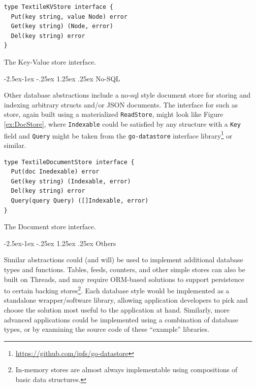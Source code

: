 \documentclass{textile}
\makeatletter
\renewcommand\paragraph{\@startsection{paragraph}{4}{\z@}%
            {-2.5ex\@plus -1ex \@minus -.25ex}%
            {1.25ex \@plus .25ex}%
            {\normalfont\normalsize\itshape}}
\makeatother
\begin{document}
\begin{example}
\begin{minipage}{.45\textwidth}
\begin{lstlisting}
type TextileKVStore interface {
  Put(key string, value Node) error
  Get(key string) (Node, error)
  Del(key string) error
}
\end{lstlisting}
\end{minipage}
\caption{The Key-Value store interface.}
 \label{ex:KVStore}
\end{example}

\paragraph{No-SQL}

Other database abstractions include a no-sql style document store for storing and indexing arbitrary structs and/or JSON documents. The interface for such as store, again built using a materialized \texttt{ReadStore}, might look like Figure \ref{ex:DocStore}, where \texttt{Indexable} could be satisfied by any structure with a \texttt{Key} field and \texttt{Query} might be taken from the \texttt{go-datastore} interface library\footnote{\url{https://github.com/ipfs/go-datastore}} or similar.

\begin{example}
\begin{minipage}{.45\textwidth}
\begin{lstlisting}
type TextileDocumentStore interface {
  Put(doc Inedexable) error
  Get(key string) (Indexable, error)
  Del(key string) error
  Query(query Query) ([]Indexable, error)
}
\end{lstlisting}
\end{minipage}
\caption{The Document store interface.}
\label{ex:DocStore}
\end{example} 

\paragraph{Others}

Similar abstractions could (and will) be used to implement additional database types and functions. Tables, feeds, counters, and other simple stores can also be built on Threads, and may require ORM-based solutions to support persistence to certain backing stores\footnote{In-memory stores are almost always implementable using compositions of basic data structures.}. Each database style would be implemented as a standalone wrapper/software library, allowing application developers to pick and choose the solution most useful to the application at hand. Similarly, more advanced applications could be implemented using a combination of database types, or by examining the source code of these ``example'' libraries.
\end{document}
